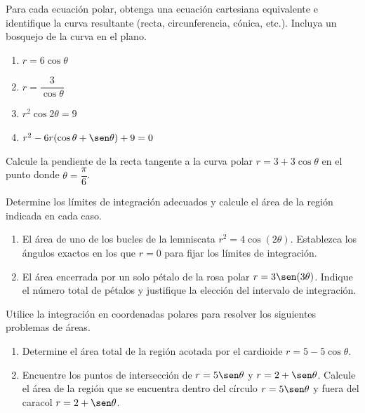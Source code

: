 \begin{prob}
Para cada ecuación polar, obtenga una ecuación cartesiana equivalente e
identifique la curva resultante (recta, circunferencia, cónica, etc.).
Incluya un bosquejo de la curva en el plano.
\begin{enumerate}
    \item $r = 6\cos\theta$
    \item $r = \dfrac{3}{\cos\theta}$
    \item $r^2\cos 2\theta = 9$
    \item $r^2 - 6r(\cos\theta + \sen\theta) + 9 = 0$
\end{enumerate}
\end{prob}

\begin{prob}
Calcule la pendiente de la recta tangente a la curva polar
$r = 3 + 3\cos\theta$ en el punto donde $\theta = \dfrac{\pi}{6}$.
\end{prob}

\begin{prob}
Determine los límites de integración adecuados y calcule el área de la región
indicada en cada caso.
\begin{enumerate}
    \item El área de uno de los bucles de la lemniscata $r^2 = 4\cos(2\theta)$.
          Establezca los ángulos exactos en los que $r = 0$ para fijar los
          límites de integración.
    \item El área encerrada por un solo pétalo de la rosa polar
          $r = 3\sen(3\theta)$. Indique el número total de pétalos y
          justifique la elección del intervalo de integración.
\end{enumerate}
\end{prob}

\begin{prob}
Utilice la integración en coordenadas polares para resolver los siguientes
problemas de áreas.
\begin{enumerate}
    \item Determine el área total de la región acotada por el cardioide
          $r = 5 - 5\cos\theta$.
    \item Encuentre los puntos de intersección de $r = 5\sen\theta$ y
          $r = 2 + \sen\theta$. Calcule el área de la región que se
          encuentra dentro del círculo $r = 5\sen\theta$ y fuera del
          caracol $r = 2 + \sen\theta$.
\end{enumerate}
\end{prob}

